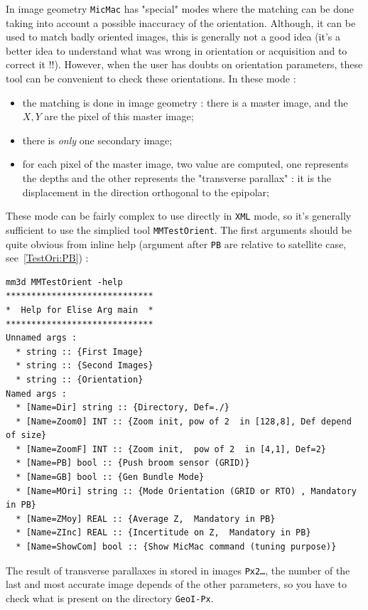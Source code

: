 In image geometry {\tt MicMac} has "special" modes where the matching can be done
taking into account a possible inaccuracy of the orientation. Although, it can be used
to match badly oriented images, this is generally not a good idea (it's a better idea to
understand what was wrong in orientation or acquisition and to correct it !!). However,
when the user has doubts on orientation parameters, these tool can  be convenient to check
these orientations. In these mode :

\begin{itemize}
   \item the matching is done in image geometry : there is a master image, and the $X,Y$
         are the pixel of this master image;
   \item there is \emph{only} one secondary image;
   \item for each pixel of the master image, two value are computed, one represents the depths
         and the other represents the "transverse parallax" : it is the displacement in the direction
         orthogonal to the epipolar;
\end{itemize}

These mode can be fairly complex to use directly in {\tt XML} mode, so it's generally sufficient
to use the simplied tool {\tt MMTestOrient}. The  first arguments should be quite obvious from
inline help (argument after {\tt PB} are relative to satellite case, see~\ref{TestOri:PB}) :

\begin{verbatim}
mm3d MMTestOrient -help
*****************************
*  Help for Elise Arg main  *
*****************************
Unnamed args :
  * string :: {First Image}
  * string :: {Second Images}
  * string :: {Orientation}
Named args :
  * [Name=Dir] string :: {Directory, Def=./}
  * [Name=Zoom0] INT :: {Zoom init, pow of 2  in [128,8], Def depend of size}
  * [Name=ZoomF] INT :: {Zoom init,  pow of 2  in [4,1], Def=2}
  * [Name=PB] bool :: {Push broom sensor (GRID)}
  * [Name=GB] bool :: {Gen Bundle Mode}
  * [Name=MOri] string :: {Mode Orientation (GRID or RTO) , Mandatory in PB}
  * [Name=ZMoy] REAL :: {Average Z,  Mandatory in PB}
  * [Name=ZInc] REAL :: {Incertitude on Z,  Mandatory in PB}
  * [Name=ShowCom] bool :: {Show MicMac command (tuning purpose)}
\end{verbatim}

The result of transverse parallaxes in stored in images {\tt Px2\dots}, the number of the last
and most accurate image depends of the other parameters, so you have to check what is
present on the directory {\tt GeoI-Px}.

